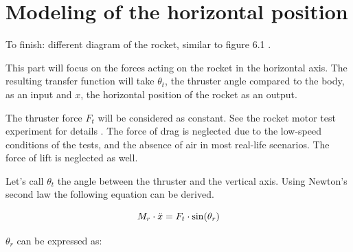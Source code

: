 		
		
		
		
		\section{Modeling of the horizontal position}

		To finish:
		different diagram of the rocket, similar to figure 6.1 .

		This part will focus on the forces acting on the rocket in the horizontal axis.
		The resulting transfer function will take $\theta_t$, the thruster angle compared to the body, as an input and $x$, the horizontal position of the rocket as an output.

		The thruster force $F_t$ will be considered as constant. See the rocket motor test experiment for details . The force of drag is neglected due to the low-speed conditions of the tests, and the absence of air in most real-life scenarios. The force of lift is neglected as well.

		Let's call $\theta_t$ the angle between the thruster and the vertical axis.
		Using Newton's second law the following equation can be derived.

		\begin{equation}
			M_r \cdot \ddot{x} = F_t \cdot \sin(\theta_r)
			\addunit{\newton}		 
			\label{eq:rocket_position_1}
		\end{equation}
		\startexplain
		\stopexplain

		$\theta_r$ can be expressed as:

